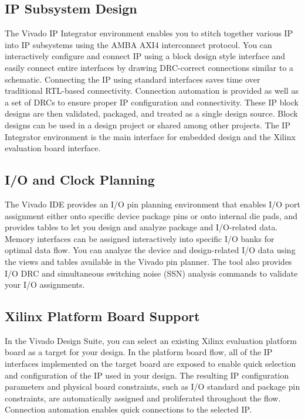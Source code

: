 \subsection{IP Subsystem Design}
The Vivado IP Integrator environment enables you to stitch together various IP into IP subsystems using the AMBA AXI4 interconnect protocol. You can interactively configure and connect IP using a block design style interface and easily connect entire interfaces by drawing DRC-correct connections similar to a schematic. Connecting the IP using standard interfaces saves time over traditional RTL-based connectivity. Connection automation is provided as well as a set of DRCs to ensure proper IP configuration and connectivity. These IP block designs are then validated, packaged, and treated as a single design source. Block designs can be used in a design project or shared among other projects. The IP Integrator environment is the main interface for embedded design and the Xilinx evaluation board interface.

\subsection{I/O and Clock Planning}
The Vivado IDE provides an I/O pin planning environment that enables I/O port assignment either onto specific device package pins or onto internal die pads, and provides tables to let you design and analyze package and I/O-related data. Memory interfaces can be assigned interactively into specific I/O banks for optimal data flow. You can analyze the device and design-related I/O data using the views and tables available in the Vivado pin planner. The tool also provides I/O DRC and simultaneous switching noise (SSN) analysis commands to validate your I/O assignments.

\subsection{Xilinx Platform Board Support}
In the Vivado Design Suite, you can select an existing Xilinx evaluation platform board as a target for your design. In the platform board flow, all of the IP interfaces implemented on the target board are exposed to enable quick selection and configuration of the IP used in your design. The resulting IP configuration parameters and physical board constraints, such as I/O standard and package pin constraints, are automatically assigned and proliferated throughout the flow. Connection automation enables quick connections to the selected IP. 

